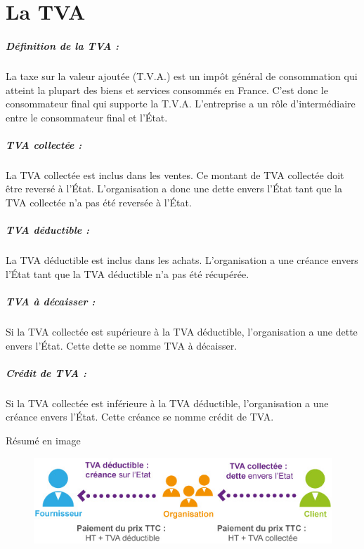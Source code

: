 \documentclass{report}
\begin{document}
\chapter{La TVA}

\paragraph*{Définition de la TVA :}
La taxe sur la valeur ajoutée (T.V.A.) est un impôt général de consommation qui atteint la plupart des biens et services consommés en France. C’est donc le consommateur final qui supporte la T.V.A. L'entreprise a un rôle d'intermédiaire entre le consommateur final et l'État.

\paragraph*{TVA collectée :} La TVA collectée est inclus dans les ventes. Ce montant de TVA collectée doit être reversé à l'État. L'organisation a donc une dette envers l'État tant que la TVA collectée n'a pas été reversée à l'État.

\paragraph*{TVA déductible :} La TVA déductible est inclus dans les achats. L'organisation a une créance envers l'État tant que la TVA déductible n'a pas été récupérée.

\paragraph*{TVA à décaisser :} Si la TVA collectée est supérieure à la TVA déductible, l’organisation a une dette envers l’État. Cette dette se nomme TVA à décaisser.

\paragraph*{Crédit de TVA :} Si la TVA collectée est inférieure à la TVA déductible, l’organisation a une créance envers l’État. Cette créance se nomme crédit de TVA.
\\

\begin{center}
Résumé en image
\end{center}

\begin{figure}[h]
\begin{center}
\includegraphics[scale=0.75]{TVA.jpg}
\end{center}
\end{figure}
\end{document}
